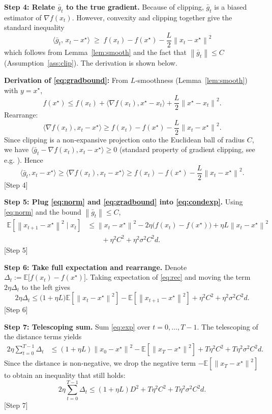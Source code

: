 \documentclass{article}
\newcommand{\E}{\mathbb{E}}
\newcommand{\norm}[1]{\left\lVert #1\right\rVert}
\begin{document}
\noindent\textbf{Step 4: Relate $\bar g_t$ to the true gradient.}
Because of clipping, $\bar g_t$ is a biased estimator of $\nabla f(x_t)$. However, convexity and clipping together give the standard inequality
\[
\langle \bar g_t,\,x_t-x^{\star}\rangle
\;\ge\;
f(x_t)-f(x^{\star}) - \frac{L}{2}\norm{x_t-x^{\star}}^{2} \tag{4}\label{eq:gradbound}
\]
which follows from Lemma~\ref{lem:smooth} and the fact that $\norm{\bar g_t}\le C$ (Assumption~\ref{ass:clip}). The derivation is shown below.

\noindent\textbf{Derivation of \eqref{eq:gradbound}:}
From $L$‑smoothness (Lemma~\ref{lem:smooth}) with $y=x^{\star}$,
\[
f(x^{\star})\le f(x_t)+\langle\nabla f(x_t),x^{\star}-x_t\rangle+\frac{L}{2}\norm{x^{\star}-x_t}^{2}.
\]
Rearrange:
\[
\langle\nabla f(x_t),x_t-x^{\star}\rangle\ge f(x_t)-f(x^{\star})-\frac{L}{2}\norm{x_t-x^{\star}}^{2}.
\]
Since clipping is a non‑expansive projection onto the Euclidean ball of radius $C$, we have
$\langle \bar g_t-\nabla f(x_t),x_t-x^{\star}\rangle\ge 0$ (standard property of gradient clipping, see e.g. \cite{abadi2016deep}). Hence
\[
\langle \bar g_t, x_t-x^{\star}\rangle
\ge \langle\nabla f(x_t),x_t-x^{\star}\rangle
\ge f(x_t)-f(x^{\star})-\frac{L}{2}\norm{x_t-x^{\star}}^{2}.
\]
[Step 4]

\noindent\textbf{Step 5: Plug \eqref{eq:norm} and \eqref{eq:gradbound} into \eqref{eq:condexp}.}
Using \eqref{eq:norm} and the bound $\norm{\bar g_t}\le C$,
\begin{align}
\E\!\left[\norm{x_{t+1}-x^{\star}}^{2}\mid x_t\right]
&\le \norm{x_t-x^{\star}}^{2}
   -2\eta\bigl(f(x_t)-f(x^{\star})\bigr)
   +\eta L \norm{x_t-x^{\star}}^{2} \nonumber\\
&\qquad +\eta^{2}C^{2}
   +\eta^{2}\sigma^{2}C^{2}d . \tag{5}\label{eq:rec}
\end{align}
[Step 5]

\noindent\textbf{Step 6: Take full expectation and rearrange.}
Denote $\Delta_t:=\E\bigl[f(x_t)-f(x^{\star})\bigr]$.
Taking expectation of \eqref{eq:rec} and moving the term $2\eta\Delta_t$ to the left gives
\[
2\eta\Delta_t
\le \bigl(1+\eta L\bigr)\E\!\left[\norm{x_t-x^{\star}}^{2}\right]
   -\E\!\left[\norm{x_{t+1}-x^{\star}}^{2}\right]
   +\eta^{2}C^{2}
   +\eta^{2}\sigma^{2}C^{2}d . \tag{6}\label{eq:exp}
\]
[Step 6]

\noindent\textbf{Step 7: Telescoping sum.}
Sum \eqref{eq:exp} over $t=0,\dots,T-1$.
The telescoping of the distance terms yields
\begin{align}
2\eta\sum_{t=0}^{T-1}\Delta_t
&\le (1+\eta L)\norm{x_0-x^{\star}}^{2}
   -\E\!\left[\norm{x_T-x^{\star}}^{2}\right]
   + T\eta^{2}C^{2}
   + T\eta^{2}\sigma^{2}C^{2}d . \tag{7}\label{eq:tel}
\end{align}
Since the distance is non‑negative, we drop the negative term $-\E[\norm{x_T-x^{\star}}^{2}]$ to obtain an inequality that still holds:
\[
2\eta\sum_{t=0}^{T-1}\Delta_t
\le (1+\eta L)D^{2}+T\eta^{2}C^{2}+T\eta^{2}\sigma^{2}C^{2}d .
\tag{8}\label{eq:bound}
\]
[Step 7]
\end{document}
